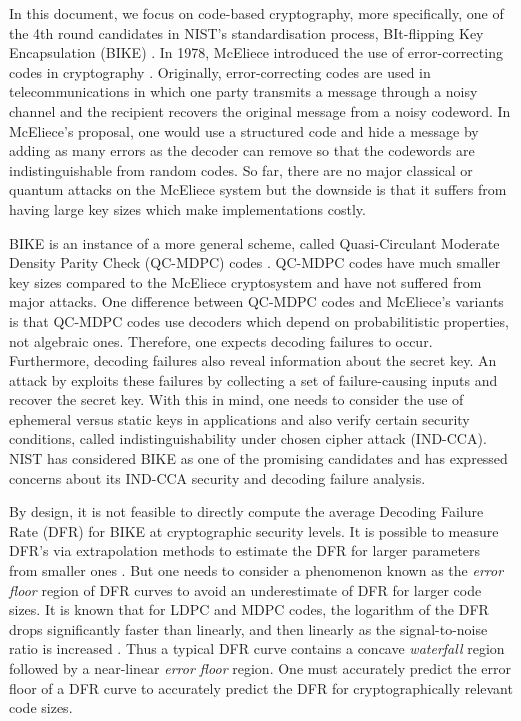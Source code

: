 In this document, we focus on code-based cryptography, more specifically, one of the 4th round candidates in NIST's standardisation process, BIt-flipping Key Encapsulation (BIKE) \cite{BIKE}. In 1978, McEliece introduced the use of error-correcting codes in cryptography \cite{mceliece}. Originally, error-correcting codes are used in telecommunications in which one party transmits a message through a noisy channel and the recipient recovers the original message from a noisy codeword. In McEliece's proposal, one would use a structured code and hide a message by adding as many errors as the decoder can remove so that the codewords are indistinguishable from random codes. So far, there are no major classical or quantum attacks on the McEliece system but the downside is that it suffers from having large key sizes which make implementations costly.

BIKE is an instance of a more general scheme, called Quasi-Circulant Moderate Density Parity Check (QC-MDPC) codes \cite{QCMDPC}. QC-MDPC codes have much smaller key sizes compared to the McEliece cryptosystem and have not suffered from major attacks. One difference between QC-MDPC codes and McEliece's variants is that QC-MDPC codes use decoders which depend on probabilitistic properties, not algebraic ones. Therefore, one expects decoding failures to occur. Furthermore, decoding failures also reveal information about the secret key. An attack by \cite{GJS} exploits these failures by collecting a set of failure-causing inputs and recover the secret key. With this in mind, one needs to consider the use of ephemeral versus static keys in applications and also verify certain security conditions, called indistinguishability under chosen cipher attack (IND-CCA). NIST has considered BIKE as one of the promising candidates and has expressed concerns about its IND-CCA security and decoding failure analysis. 

By design, it is not feasible to directly compute the average Decoding Failure Rate (DFR) for BIKE at cryptographic security levels. It is possible to measure DFR's via extrapolation methods to estimate the DFR for larger parameters from smaller ones \cite{SV:2019:extrapolate,DGK20a}. But one needs to consider a phenomenon known as the \textit{error floor} region of DFR curves to avoid an underestimate of DFR for larger code sizes.  It is known that for LDPC and MDPC codes, the logarithm of the DFR drops significantly faster than linearly, and then linearly as the signal-to-noise ratio is increased \cite{bgf,Richardson03}. Thus a typical DFR curve contains a concave \textit{waterfall} region followed by a near-linear \textit{error floor} region. One must accurately predict the error floor of a DFR curve to accurately predict the DFR for cryptographically relevant code sizes.

